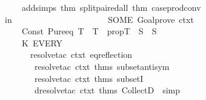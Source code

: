 \begin{isabellebody}
\ \ \ \ \ \ \ \ \ \ \ \ \ \ \ \ \ \ \ \ \ \ \ \ addsimps\ {\isacharbrackleft}{\kern0pt}{\isacharat}{\kern0pt}{\isacharbraceleft}{\kern0pt}thm\ split{\isacharunderscore}{\kern0pt}paired{\isacharunderscore}{\kern0pt}all{\isacharbraceright}{\kern0pt}{\isacharcomma}{\kern0pt}\ {\isacharat}{\kern0pt}{\isacharbraceleft}{\kern0pt}thm\ case{\isacharunderscore}{\kern0pt}prod{\isacharunderscore}{\kern0pt}conv{\isacharbraceright}{\kern0pt}{\isacharbrackright}{\kern0pt}{\isacharparenright}{\kern0pt}\ {}\isanewline
\ \ \ \ \ \ \ \ \ \ \ \ \ \ \ \ \ \ \ \ in\isanewline
\ \ \ \ \ \ \ \ \ \ \ \ \ \ \ \ \ \ \ \ \ \ SOME\ {\isacharparenleft}{\kern0pt}Goal{\isachardot}{\kern0pt}prove\ ctxt\ {\isacharbrackleft}{\kern0pt}{\isacharbrackright}{\kern0pt}\ {\isacharbrackleft}{\kern0pt}{\isacharbrackright}{\kern0pt}\isanewline
\ \ \ \ \ \ \ \ \ \ \ \ \ \ \ \ \ \ \ \ \ \ \ \ {\isacharparenleft}{\kern0pt}Const\ {\isacharparenleft}{\kern0pt}\isactrlconstUNDERSCOREname {\isasymopen}Pure{\isachardot}{\kern0pt}eq{\isasymclose}{\isacharcomma}{\kern0pt}\ T\ {\isacharminus}{\kern0pt}{\isacharminus}{\kern0pt}{\isachargreater}{\kern0pt}\ T\ {\isacharminus}{\kern0pt}{\isacharminus}{\kern0pt}{\isachargreater}{\kern0pt}\ propT{\isacharparenright}{\kern0pt}\ {\isachardollar}{\kern0pt}\ S\ {\isachardollar}{\kern0pt}\ S{\isacharprime}{\kern0pt}{\isacharparenright}{\kern0pt}\isanewline
\ \ \ \ \ \ \ \ \ \ \ \ \ \ \ \ \ \ \ \ \ \ \ \ {\isacharparenleft}{\kern0pt}K\ {\isacharparenleft}{\kern0pt}EVERY\isanewline
\ \ \ \ \ \ \ \ \ \ \ \ \ \ \ \ \ \ \ \ \ \ \ \ \ \ {\isacharbrackleft}{\kern0pt}resolve{\isacharunderscore}{\kern0pt}tac\ ctxt\ {\isacharbrackleft}{\kern0pt}eq{\isacharunderscore}{\kern0pt}reflection{\isacharbrackright}{\kern0pt}\ {}{\isacharcomma}{\kern0pt}\isanewline
\ \ \ \ \ \ \ \ \ \ \ \ \ \ \ \ \ \ \ \ \ \ \ \ \ \ \ resolve{\isacharunderscore}{\kern0pt}tac\ ctxt\ {\isacharat}{\kern0pt}{\isacharbraceleft}{\kern0pt}thms\ subset{\isacharunderscore}{\kern0pt}antisym{\isacharbraceright}{\kern0pt}\ {}{\isacharcomma}{\kern0pt}\isanewline
\ \ \ \ \ \ \ \ \ \ \ \ \ \ \ \ \ \ \ \ \ \ \ \ \ \ \ resolve{\isacharunderscore}{\kern0pt}tac\ ctxt\ {\isacharat}{\kern0pt}{\isacharbraceleft}{\kern0pt}thms\ subsetI{\isacharbraceright}{\kern0pt}\ {}{\isacharcomma}{\kern0pt}\isanewline
\ \ \ \ \ \ \ \ \ \ \ \ \ \ \ \ \ \ \ \ \ \ \ \ \ \ \ dresolve{\isacharunderscore}{\kern0pt}tac\ ctxt\ {\isacharat}{\kern0pt}{\isacharbraceleft}{\kern0pt}thms\ CollectD{\isacharbraceright}{\kern0pt}\ {}{\isacharcomma}{\kern0pt}\ simp{\isacharcomma}{\kern0pt}\isanewline

\end{isabellebody}
